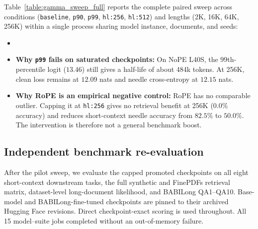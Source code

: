 Table~\ref{table:gamma_sweep_full} reports the complete paired sweep across conditions (\texttt{baseline}, \texttt{p90}, \texttt{p99}, \texttt{hl:256}, \texttt{hl:512}) and lengths (2K, 16K, 64K, 256K) within a single process sharing model instance, documents, and seeds:
\begin{itemize}
  \item {}
  \item \textbf{Why \texttt{p99} fails on saturated checkpoints:} On NoPE L40S, the 99th-percentile logit ($13.46$) still gives a half-life of about 484k tokens. At 256K, clean loss remains at $12.09$ nats and needle cross-entropy at $12.15$ nats.
  \item \textbf{Why RoPE is an empirical negative control:} RoPE has no comparable outlier. Capping it at \texttt{hl:256} gives no retrieval benefit at 256K ($0.0\%$ accuracy) and reduces short-context needle accuracy from $82.5\%$ to $50.0\%$. The intervention is therefore not a general benchmark boost.
\end{itemize}

\subsection{Independent benchmark re-evaluation}
After the pilot sweep, we evaluate the capped promoted checkpoints on all eight short-context downstream tasks, the full synthetic and FinePDFs retrieval matrix, dataset-level long-document likelihood, and BABILong QA1--QA10. Base-model and BABILong-fine-tuned checkpoints are pinned to their archived Hugging Face revisions. Direct checkpoint-exact scoring is used throughout. All 15 model--suite jobs completed without an out-of-memory failure.

